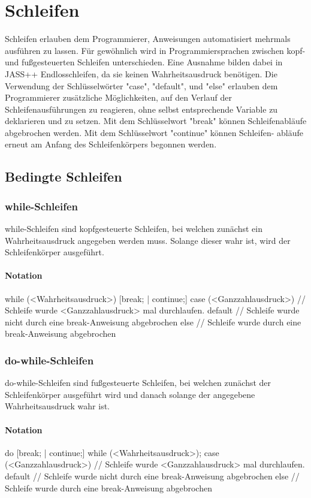 \chapter{Schleifen}
Schleifen erlauben dem Programmierer, Anweisungen automatisiert mehrmals ausführen zu lassen.
Für gewöhnlich wird in Programmiersprachen zwischen kopf- und fußgesteuerten Schleifen unterschieden.
Eine Ausnahme bilden dabei in JASS++ Endlosschleifen, da sie keinen Wahrheitsausdruck benötigen.
Die Verwendung der Schlüsselwörter "case", "default", und "else" erlauben dem Programmierer zusätzliche Möglichkeiten,
auf den Verlauf der Schleifenausführungen zu reagieren, ohne selbst entsprechende Variable zu deklarieren und zu setzen.
Mit dem Schlüsselwort "break" können Schleifenabläufe abgebrochen werden. Mit dem Schlüsselwort "continue" können Schleifen-
abläufe erneut am Anfang des Schleifenkörpers begonnen werden.

\section{Bedingte Schleifen}

\subsection{while-Schleifen}
while-Schleifen sind kopfgesteuerte Schleifen, bei welchen zunächst ein Wahrheitsausdruck angegeben werden muss.
Solange dieser wahr ist, wird der Schleifenkörper ausgeführt.

\subsubsection{Notation}
while (<Wahrheitsausdruck>)
{
	[break; | continue;]
}
case (<Ganzzahlausdruck>) // Schleife wurde <Ganzzahlausdruck> mal durchlaufen.
{
}
default // Schleife wurde nicht durch eine break-Anweisung abgebrochen
{
}
else // Schleife wurde durch eine break-Anweisung abgebrochen
{
}

\subsection{do-while-Schleifen}
do-while-Schleifen sind fußgesteuerte Schleifen, bei welchen zunächst der Schleifenkörper ausgeführt wird und danach
solange der angegebene Wahrheitsausdruck wahr ist.

\subsubsection{Notation}
do
{
	[break; | continue;]
}
while (<Wahrheitsausdruck>);
case (<Ganzzahlausdruck>) // Schleife wurde <Ganzzahlausdruck> mal durchlaufen.
{
}
default // Schleife wurde nicht durch eine break-Anweisung abgebrochen
{
}
else // Schleife wurde durch eine break-Anweisung abgebrochen
{
}

